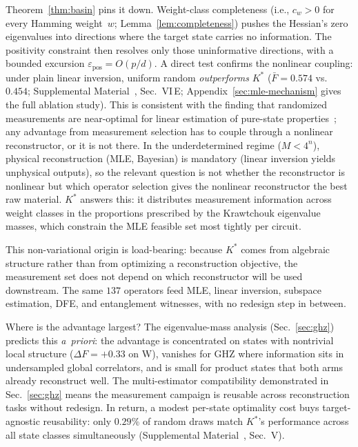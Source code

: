 \documentclass[twocolumn,prx,aps,superscriptaddress,longbibliography,floatfix]{revtex4-2}
\begin{document}
Theorem~\ref{thm:basin} pins it down.  Weight-class completeness
(i.e., $c_w > 0$ for every Hamming weight~$w$;
Lemma~\ref{lem:completeness})
pushes the Hessian's zero eigenvalues into directions where the
target state carries no information.  The positivity constraint
then resolves only those uninformative directions, with a bounded
excursion $\varepsilon_{\mathrm{pos}} = O(p/d)$.  A direct test
confirms the nonlinear coupling: under plain linear inversion,
uniform random \emph{outperforms} $K^*$ ($\bar{F} = 0.574$ vs.\
$0.454$; Supplemental Material~\cite{supplemental}, Sec.~VI\,E;
Appendix~\ref{sec:mle-mechanism} gives the full ablation study).
This is consistent with the finding that randomized measurements are
near-optimal for linear estimation of pure-state
properties~\cite{Huang2020}; any advantage from measurement
selection has to couple through a nonlinear reconstructor, or it
is not there.
In the underdetermined regime ($M < 4^n$), physical reconstruction
(MLE, Bayesian) is mandatory (linear inversion yields unphysical
outputs), so the relevant question is not whether the reconstructor
is nonlinear but which operator selection gives the nonlinear
reconstructor the best raw material.
$K^*$ answers this: it distributes measurement information across
weight classes in the proportions prescribed by the Krawtchouk
eigenvalue masses, which constrain the MLE feasible set most
tightly per circuit.

This non-variational origin is load-bearing: because $K^*$ comes
from algebraic structure rather than from optimizing a
reconstruction objective, the measurement set does not depend on
which reconstructor will be used downstream.  The same $137$
operators feed MLE, linear inversion, subspace estimation, DFE,
and entanglement witnesses, with no redesign step in between.

Where is the advantage largest?  The eigenvalue-mass analysis
(Sec.~\ref{sec:ghz}) predicts this \emph{a~priori}: the advantage
is concentrated on states with nontrivial local structure
($\Delta F = +0.33$ on W), vanishes for GHZ where information
sits in undersampled global correlators, and is small for product
states that both arms already reconstruct well.
The multi-estimator compatibility demonstrated in
Sec.~\ref{sec:ghz} means the measurement campaign is
reusable across reconstruction tasks without redesign.
In return, a modest per-state optimality cost buys
target-agnostic reusability: only $0.29$\% of random draws
match $K^*$'s performance across all state classes simultaneously
(Supplemental Material~\cite{supplemental}, Sec.~V).
\end{document}
